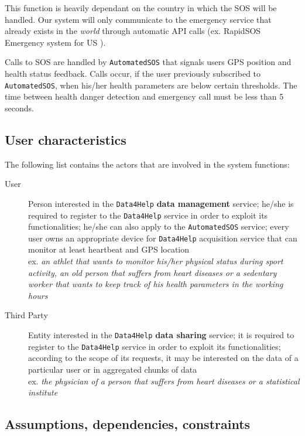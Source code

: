       This function is heavily dependant on the country in which the SOS will be handled. Our system will only communicate to the emergency service that already exists in the \textit{world} through automatic API calls (ex. RapidSOS Emergency system for US \cite{sos}).

      Calls to SOS are handled by \texttt{AutomatedSOS} that signals users GPS position and health status feedback. Calls occur, if the user previously subscribed to \texttt{AutomatedSOS}, when his/her health parameters are below certain thresholds. The time between health danger detection and emergency call must be less than 5 seconds.

  \subsection{User characteristics}

    The following list contains the actors that are involved in the system functions:

      \begin{description}
        \item [User] Person interested in the \texttt{Data4Help} \textbf{data management} service; he/she is required to register to the \texttt{Data4Help} service in order to exploit its functionalities; he/she can also apply to the \texttt{AutomatedSOS} service; every user owns an appropriate device for \texttt{Data4Help} acquisition service that can monitor at least heartbeat and GPS location \\
        ex. \textit{an athlet that wants to monitor his/her physical status during sport activity, an old person that suffers from heart diseases or a sedentary worker that wants to keep track of his health parameters in the working hours}
        \item [Third Party] Entity interested in the \texttt{Data4Help} \textbf{data sharing} service; it is required to register to the \texttt{Data4Help} service in order to exploit its functionalities; according to the scope of its requests, it may be interested on the data of a particular user or in aggregated chunks of data \\
        ex. \textit{the physician of a person that suffers from heart diseases or a statistical institute}
      \end{description}

  \subsection{Assumptions, dependencies, constraints}

